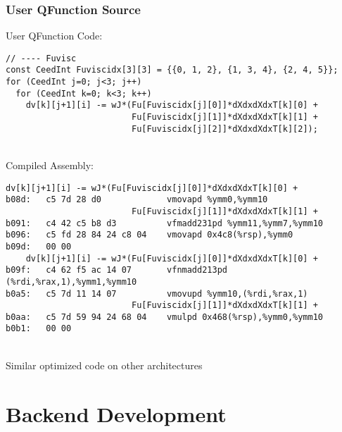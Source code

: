 \documentclass{beamer}
\begin{document}
\begin{frame}[fragile]
\begin{center}
\frametitle{User QFunction Source}

User QFunction Code:
{\tiny
\begin{lstlisting}[style=C]
// ---- Fuvisc
const CeedInt Fuviscidx[3][3] = {{0, 1, 2}, {1, 3, 4}, {2, 4, 5}};
for (CeedInt j=0; j<3; j++)
  for (CeedInt k=0; k<3; k++)
    dv[k][j+1][i] -= wJ*(Fu[Fuviscidx[j][0]]*dXdxdXdxT[k][0] +
                         Fu[Fuviscidx[j][1]]*dXdxdXdxT[k][1] +
                         Fu[Fuviscidx[j][2]]*dXdxdXdxT[k][2]);
\end{lstlisting}
}

~\\

Compiled Assembly:
{\tiny
\begin{lstlisting}[style=assembly]
    dv[k][j+1][i] -= wJ*(Fu[Fuviscidx[j][0]]*dXdxdXdxT[k][0] +
b08d:	c5 7d 28 d0          	vmovapd %ymm0,%ymm10
                         Fu[Fuviscidx[j][1]]*dXdxdXdxT[k][1] +
b091:	c4 42 c5 b8 d3       	vfmadd231pd %ymm11,%ymm7,%ymm10
b096:	c5 fd 28 84 24 c8 04 	vmovapd 0x4c8(%rsp),%ymm0
b09d:	00 00 
    dv[k][j+1][i] -= wJ*(Fu[Fuviscidx[j][0]]*dXdxdXdxT[k][0] +
b09f:	c4 62 f5 ac 14 07    	vfnmadd213pd (%rdi,%rax,1),%ymm1,%ymm10
b0a5:	c5 7d 11 14 07       	vmovupd %ymm10,(%rdi,%rax,1)
                         Fu[Fuviscidx[j][1]]*dXdxdXdxT[k][1] +
b0aa:	c5 7d 59 94 24 68 04 	vmulpd 0x468(%rsp),%ymm0,%ymm10
b0b1:	00 00
\end{lstlisting}
}

~\\

Similar optimized code on other architectures

\end{center}
\end{frame}

\section{Backend Development}
\end{document}
